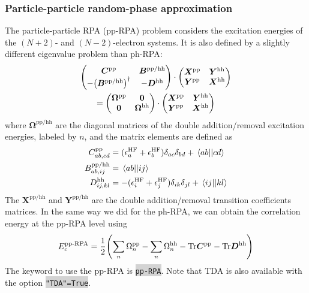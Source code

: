 \documentclass[aip,jcp,reprint,noshowkeys,superscriptaddress]{revtex4-1}
\newcommand{\HF}{\text{HF}}
\newcommand{\pp}{\text{pp}}
\newcommand{\hh}{\text{hh}}
\newcommand{\ep}{\epsilon}
\newcommand{\bO}{\boldsymbol{0}}
\newcommand{\bX}{\bm{X}}
\newcommand{\bY}{\bm{Y}}
\newcommand{\bB}{\boldsymbol{B}}
\newcommand{\bC}{\boldsymbol{C}}
\newcommand{\bD}{\boldsymbol{D}}
\newcommand{\bOme}{\boldsymbol{\Omega}}
\newcommand{\EcppRPA}{E_c^{\text{pp-RPA}}}
\newcommand{\pERI}[2]{\mel{#1}{}{#2}}
\newcommand{\keyword}[1]{{\colorbox{lightgray}{\texttt{#1}}}}
\begin{document}
\subsubsection*{Particle-particle random-phase approximation}
\label{subsec:pp-RPA}

The particle-particle RPA (pp-RPA) problem considers the excitation energies of the $(N+2)$- and $(N-2)$-electron systems. \cite{SchuckBook} It is also defined by a slightly different eigenvalue problem than ph-RPA:
\begin{multline}
\label{eq:ppRPA}
	\begin{pmatrix}
		\bC^{\pp} & \bB^{\pp/\hh}
		\\
		-\qty(\bB^{\pp/\hh})^{\dag} &  -\bD^{\hh}
	\end{pmatrix}
	\cdot
	\begin{pmatrix}
		\bX^{\pp} & \bY^{\hh}
		\\
		\bY^{\pp} & \bX^{\hh}
	\end{pmatrix}
	\\
	=
	\begin{pmatrix}
		\bOme^{\pp} & \bO 
		\\
		\bO & \bOme^{\hh}
	\end{pmatrix}
	\cdot
	\begin{pmatrix}
		\bX^{\pp} & \bY^{\hh}
		\\
		\bY^{\pp} & \bX^{\hh}
	\end{pmatrix}
\end{multline} 
where $\bOme^{\pp/\hh}$ are the diagonal matrices of the double addition/removal excitation energies, labeled by $n$, and the matrix elements are defined as 
\begin{subequations}
\begin{align}
	C_{ab,cd}^{\pp} 
	& = (\ep_{a}^{\HF} + \ep_{b}^{\HF}) \delta_{ac} \delta_{bd} + \pERI{ab}{cd}
	\\
	B_{ab,ij}^{\pp/\hh} 
	& = \pERI{ab}{ij}
	\\
	D_{ij,kl}^{\hh} 
	& = -(\ep_{i}^{\HF} + \ep_{j}^{\HF}) \delta_{ik} \delta_{jl} + \pERI{ij}{kl}
\end{align}
\end{subequations}
The $\bX^{\pp/\hh}$ and $\bY^{\pp/\hh}$ are the double addition/removal transition coefficients matrices. In the same way we did for the ph-RPA, we can obtain the correlation energy at the pp-RPA level using \cite{Peng_2013,Scuseria_2013}
\begin{equation}
	\EcppRPA = \frac{1}{2} \qty(\sum_n \Omega_n^{\pp}  - \sum_n \Omega_n^{\hh}  - \text{Tr}\bm{C}^{\pp} - \text{Tr}\bm{D}^{\hh})
\end{equation}
The keyword to use the pp-RPA is \keyword{pp-RPA}. Note that TDA is also available with the option \keyword{"TDA"=True}.
\end{document}
